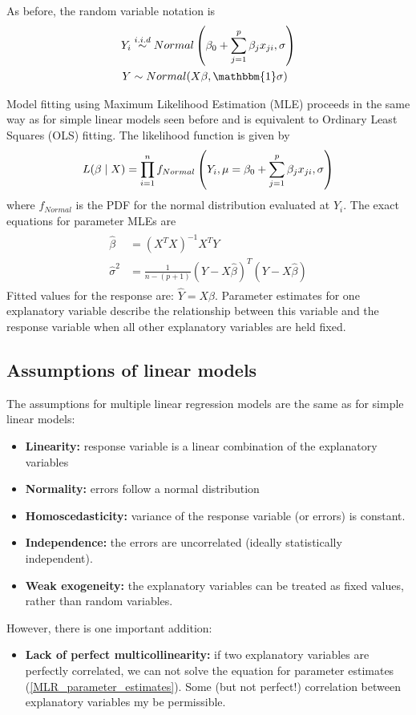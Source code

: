 As before, the random variable notation is
\begin{align}
	Y_i &\overset{i.i.d}{\sim} Normal\left(\beta_0 + \sum_{j=1}^{p} \beta_jx_{ji},\sigma\right) \notag \\
	Y &\sim Normal(X\beta,\mathbbm{1}\sigma) \notag
\end{align}

Model fitting using Maximum Likelihood Estimation (MLE) proceeds in the same way as for simple linear models seen before and is equivalent to Ordinary Least Squares (OLS) fitting. The likelihood function is given by
\begin{align}
	L(\beta\mid X) = \prod_{i=1}^n f_{Normal}\left(Y_i,\mu=\beta_0+\sum_{j=1}^{p} \beta_jx_{ji},\sigma\right)\notag
\end{align}
where $f_{Normal}$ is the PDF for the normal distribution evaluated at $Y_i$. The exact equations for parameter MLEs are
\begin{align}
	\label{MLR_parameter_estimates}
	\begin{split}
		\hat{\beta} &= (X^TX)^{-1}X^TY \\
		\hat{\sigma}^2 &= \frac{1}{n-(p+1)}(Y-X\hat{\beta})^T(Y-X\hat{\beta})
	\end{split}
\end{align}
Fitted values for the response are: $\hat{Y} = X\hat{\beta}$. Parameter estimates for one explanatory variable describe the relationship between this variable and the response variable when all other explanatory variables are held fixed.

\subsection{Assumptions of linear models}

The assumptions for multiple linear regression models are the same as for simple linear models:
\begin{itemize}
	\item \textbf{Linearity:} response variable is a linear combination of the explanatory variables
	\item \textbf{Normality:} errors follow a normal distribution
	\item \textbf{Homoscedasticity:} variance of the response variable (or errors) is constant.
	\item \textbf{Independence:} the errors are uncorrelated (ideally statistically independent).
	\item \textbf{Weak exogeneity:} the explanatory variables can be treated as fixed values, rather than random variables.
\end{itemize}
However, there is one important addition:
\begin{itemize}
	\item \textbf{Lack of perfect multicollinearity:} if two explanatory variables are perfectly correlated, we can not solve the equation for parameter estimates (\cref{MLR_parameter_estimates}). Some (but not perfect!) correlation between explanatory variables my be permissible.
\end{itemize}

